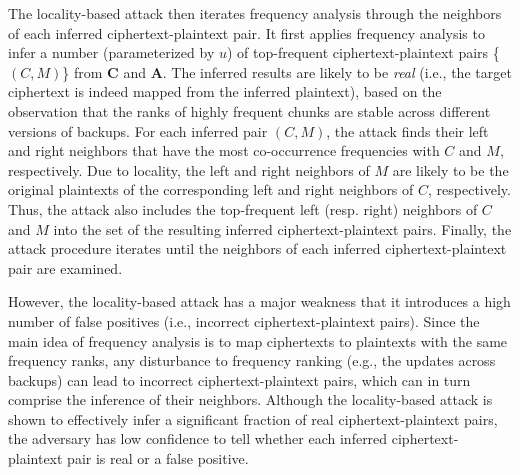The locality-based attack then iterates frequency analysis through the
neighbors of each inferred ciphertext-plaintext pair.  It first applies
frequency analysis to infer a number (parameterized by $u$) of top-frequent
ciphertext-plaintext pairs \{$(C, M)$\} from $\mathbf{C}$ and $\mathbf{A}$.
The inferred results are likely to be {\em real} (i.e., the target ciphertext
is indeed mapped from the inferred plaintext), based on the observation that
the ranks of highly frequent chunks are stable across different versions of
backups.  For each inferred pair $(C, M)$, the attack finds their left and
right neighbors that have the most co-occurrence frequencies with $C$ and $M$,
respectively.  Due to locality, the left and right neighbors of $M$ are likely
to be the original plaintexts of the corresponding left and right neighbors of
$C$, respectively.  Thus, the attack also includes the top-frequent left
(resp. right) neighbors of $C$ and $M$ into the set of the resulting inferred
ciphertext-plaintext pairs.  Finally, the attack procedure iterates until the
neighbors of each inferred ciphertext-plaintext pair are examined. 



However, the locality-based attack has a major weakness that it  introduces
a high number of false positives (i.e., incorrect ciphertext-plaintext pairs).
Since the main idea of frequency analysis is to map ciphertexts to plaintexts
with the same frequency ranks, any disturbance to frequency ranking (e.g., 
the updates across backups) can lead to incorrect ciphertext-plaintext pairs,
which can in turn comprise the inference of their neighbors.  Although the
locality-based attack is shown to effectively infer a significant fraction of
real ciphertext-plaintext pairs,  the adversary has low confidence to tell
whether each inferred ciphertext-plaintext pair is real or a false positive.  

